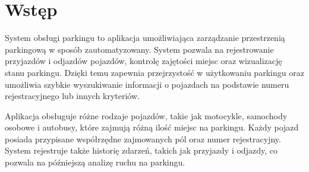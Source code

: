 ﻿\chapter*{Wstęp}

System obsługi parkingu to aplikacja umożliwiająca zarządzanie przestrzenią parkingową w sposób zautomatyzowany. System pozwala na rejestrowanie przyjazdów i odjazdów pojazdów, kontrolę zajętości miejsc oraz wizualizację stanu parkingu. Dzięki temu zapewnia przejrzystość w użytkowaniu parkingu oraz umożliwia szybkie wyszukiwanie informacji o pojazdach na podstawie numeru rejestracyjnego lub innych kryteriów.

Aplikacja obsługuje różne rodzaje pojazdów, takie jak motocykle, samochody osobowe i autobusy, które zajmują różną ilość miejsc na parkingu. Każdy pojazd posiada przypisane współrzędne zajmowanych pól oraz numer rejestracyjny. System rejestruje także historię zdarzeń, takich jak przyjazdy i odjazdy, co pozwala na późniejszą analizę ruchu na parkingu.

\